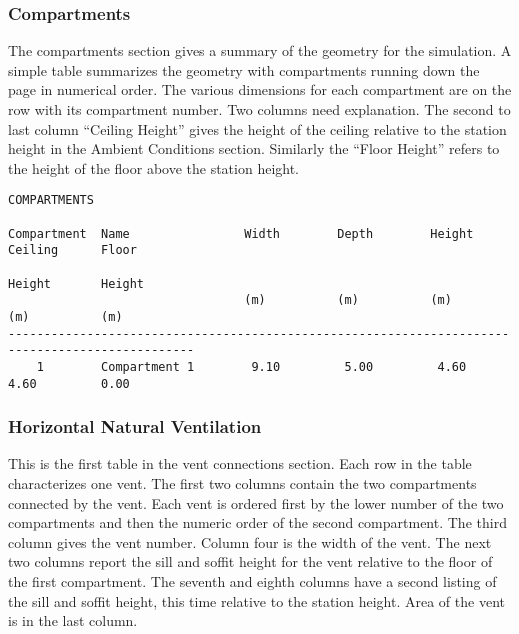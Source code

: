 \subsubsection{Compartments}

The compartments section gives a summary of the geometry for the simulation.  A simple table summarizes the geometry with compartments running down the page in numerical order.  The various dimensions for each compartment are on the row with its compartment number.  Two columns need explanation.  The second to last column ``Ceiling Height'' gives the height of the ceiling relative to the station height in the Ambient Conditions section.  Similarly the ``Floor Height'' refers to the height of the floor above the station height.

\begin{lstlisting}[basicstyle=\scriptsize]
COMPARTMENTS

Compartment  Name                Width        Depth        Height       Ceiling      Floor
                                                                        Height       Height
                                 (m)          (m)          (m)          (m)          (m)
------------------------------------------------------------------------------------------------
    1        Compartment 1        9.10         5.00         4.60         4.60         0.00
\end{lstlisting}


\subsubsection{Horizontal Natural Ventilation}

This is the first table in the vent connections section.  Each row in the table characterizes one vent.  The first two columns contain the two compartments connected by the vent.  Each vent is ordered first by the lower number of the two compartments and then the numeric order of the second compartment.  The third column gives the vent number.  Column four is the width of the vent.  The next two columns report the sill and soffit height for the vent relative to the floor of the first compartment.  The seventh and eighth columns have a second listing of the sill and soffit height, this time relative to the station height.  Area of the vent is in the last column.

